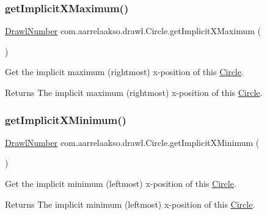 \subsubsection{\texorpdfstring{get\+Implicit\+X\+Maximum()}{getImplicitXMaximum()}}
{\footnotesize\ttfamily \hyperlink{classcom_1_1aarrelaakso_1_1drawl_1_1_drawl_number}{Drawl\+Number} com.\+aarrelaakso.\+drawl.\+Circle.\+get\+Implicit\+X\+Maximum (\begin{DoxyParamCaption}{ }\end{DoxyParamCaption})\hspace{0.3cm}{\ttfamily [protected]}}



Get the implicit maximum (rightmost) x-\/position of this \hyperlink{classcom_1_1aarrelaakso_1_1drawl_1_1_circle}{Circle}. 

\begin{DoxyReturn}{Returns}
The implicit maximum (rightmost) x-\/position of this \hyperlink{classcom_1_1aarrelaakso_1_1drawl_1_1_circle}{Circle}. 
\end{DoxyReturn}
\mbox{\label{classcom_1_1aarrelaakso_1_1drawl_1_1_circle_a592ebc277b29fc55879799f7ea195a79}} 
\subsubsection{\texorpdfstring{get\+Implicit\+X\+Minimum()}{getImplicitXMinimum()}}
{\footnotesize\ttfamily \hyperlink{classcom_1_1aarrelaakso_1_1drawl_1_1_drawl_number}{Drawl\+Number} com.\+aarrelaakso.\+drawl.\+Circle.\+get\+Implicit\+X\+Minimum (\begin{DoxyParamCaption}{ }\end{DoxyParamCaption})\hspace{0.3cm}{\ttfamily [protected]}}



Get the implicit minimum (leftmost) x-\/position of this \hyperlink{classcom_1_1aarrelaakso_1_1drawl_1_1_circle}{Circle}. 

\begin{DoxyReturn}{Returns}
The implicit minimum (leftmost) x-\/position of this \hyperlink{classcom_1_1aarrelaakso_1_1drawl_1_1_circle}{Circle}. 
\end{DoxyReturn}
\mbox{\label{classcom_1_1aarrelaakso_1_1drawl_1_1_shape_ac7a69f5cb9dd954f5054a3bebc35af41}} 
